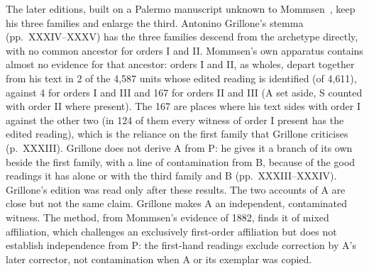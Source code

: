 \documentclass[11pt,a4paper]{article}
\theoremstyle{remark}
\begin{document}
The later editions, built on a Palermo manuscript unknown to Mommsen~\citep{GiuntaGrillone1991,Grillone2017}, keep his three families and enlarge the third. Antonino Grillone's stemma (pp.~XXXIV--XXXV) has the three families descend from the archetype directly, with no common ancestor for orders I and II. Mommsen's own apparatus contains almost no evidence for that ancestor: orders I and II, as wholes, depart together from his text in 2 of the 4{,}587 units whose edited reading is identified (of 4{,}611), against 4 for orders I and III and 167 for orders II and III (A set aside, S counted with order II where present). The 167 are places where his text sides with order I against the other two (in 124 of them every witness of order I present has the edited reading), which is the reliance on the first family that Grillone criticises (p.~XXXIII). Grillone does not derive A from P: he gives it a branch of its own beside the first family, with a line of contamination from B, because of the good readings it has alone or with the third family and B (pp.~XXXIII--XXXIV). Grillone's edition was read only after these results. The two accounts of A are close but not the same claim. Grillone makes A an independent, contaminated witness. The method, from Mommsen's evidence of 1882, finds it of mixed affiliation, which challenges an exclusively first-order affiliation but does not establish independence from P: the first-hand readings exclude correction by A's later corrector, not contamination when A or its exemplar was copied.
\end{document}
